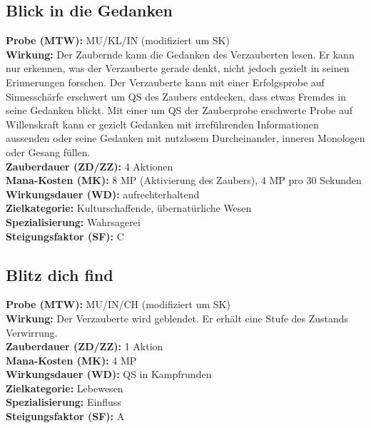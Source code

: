 \subsection{Blick in die Gedanken}
\label{chap:blick_in_die_gedanken}
\textbf{Probe (MTW):} MU/KL/IN (modifiziert um SK) \\
\textbf{Wirkung:} Der Zaubernde kann die Gedanken des Verzauberten lesen. Er kann nur erkennen, was der Verzauberte gerade denkt, nicht jedoch gezielt in seinen Erinnerungen forschen. Der Verzauberte kann mit einer Erfolgsprobe auf Sinnesschärfe erschwert um QS des Zaubers entdecken, dass etwas Fremdes in seine Gedanken blickt. Mit einer um QS der Zauberprobe erschwerte Probe auf Willenskraft kann er gezielt Gedanken mit irreführenden Informationen aussenden oder seine Gedanken mit nutzlosem Durcheinander, inneren Monologen oder Gesang füllen. \\
\textbf{Zauberdauer (ZD/ZZ):} 4 Aktionen \\
\textbf{Mana-Kosten (MK):} 8 MP (Aktivierung des Zaubers), 4 MP pro 30 Sekunden \\
\textbf{Wirkungsdauer (WD):} aufrechterhaltend \\
\textbf{Zielkategorie:} Kulturschaffende, übernatürliche Wesen \\
\textbf{Spezialisierung:} Wahrsagerei \\
\textbf{Steigungsfaktor (SF):} C


\subsection{Blitz dich find}
\label{chap:blitz_dich_find}
\textbf{Probe (MTW):} MU/IN/CH (modifiziert um SK) \\
\textbf{Wirkung:} Der Verzauberte wird geblendet. Er erhält eine Stufe des Zustands Verwirrung. \\
\textbf{Zauberdauer (ZD/ZZ):} 1 Aktion \\
\textbf{Mana-Kosten (MK):} 4 MP \\
\textbf{Wirkungsdauer (WD):} QS in Kampfrunden \\
\textbf{Zielkategorie:} Lebewesen \\
\textbf{Spezialisierung:} Einfluss \\
\textbf{Steigungsfaktor (SF):} A


